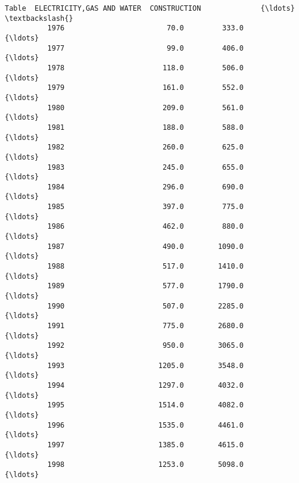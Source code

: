 \documentclass[11pt]{article}
\begin{document}
\begin{Verbatim}[commandchars=\\\{\}]
          Table  ELECTRICITY,GAS AND WATER  CONSTRUCTION              {\ldots}               \textbackslash{}
          1976                        70.0         333.0              {\ldots}                
          1977                        99.0         406.0              {\ldots}                
          1978                       118.0         506.0              {\ldots}                
          1979                       161.0         552.0              {\ldots}                
          1980                       209.0         561.0              {\ldots}                
          1981                       188.0         588.0              {\ldots}                
          1982                       260.0         625.0              {\ldots}                
          1983                       245.0         655.0              {\ldots}                
          1984                       296.0         690.0              {\ldots}                
          1985                       397.0         775.0              {\ldots}                
          1986                       462.0         880.0              {\ldots}                
          1987                       490.0        1090.0              {\ldots}                
          1988                       517.0        1410.0              {\ldots}                
          1989                       577.0        1790.0              {\ldots}                
          1990                       507.0        2285.0              {\ldots}                
          1991                       775.0        2680.0              {\ldots}                
          1992                       950.0        3065.0              {\ldots}                
          1993                      1205.0        3548.0              {\ldots}                
          1994                      1297.0        4032.0              {\ldots}                
          1995                      1514.0        4082.0              {\ldots}                
          1996                      1535.0        4461.0              {\ldots}                
          1997                      1385.0        4615.0              {\ldots}                
          1998                      1253.0        5098.0              {\ldots}                
          

\end{Verbatim}
\end{document}
